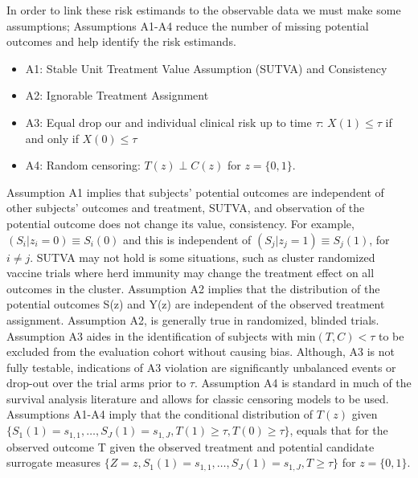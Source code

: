 \documentclass[times, doublespace]{simauth}
\begin{document}
In order to link these risk estimands to the observable data we must make some assumptions; Assumptions A1-A4 reduce the number of missing potential outcomes and help identify the risk estimands.
\begin{itemize}
\item A1: Stable Unit Treatment Value Assumption (SUTVA) and Consistency 
\item A2: Ignorable Treatment Assignment
\item A3: Equal drop our and individual clinical risk up to time $\tau$: $X(1)\leq\tau$ if and only if $X(0)\leq\tau$
\item A4: Random censoring: $T(z) \perp C(z)$ for $z=\{0,1\}$.
\end{itemize} 
Assumption A1 implies that subjects' potential outcomes are independent of other subjects' outcomes and treatment, SUTVA, and observation of the potential outcome does not change its value, consistency. For example, $(S_i|z_i=0) \equiv S_i(0)$ and this is independent of $(S_j|z_j=1) \equiv S_j(1)$, for $i \neq j$. SUTVA may not hold is some situations, such as cluster randomized vaccine trials where herd immunity may change the treatment effect on all outcomes in the cluster.  Assumption A2 implies that the distribution of the potential outcomes S(z) and Y(z) are independent of the observed treatment assignment. Assumption A2, is generally true in randomized, blinded trials.  Assumption A3 aides in the identification of subjects with min$(T,C) < \tau$ to be excluded from the evaluation cohort without causing bias. Although, A3 is not fully testable, indications of A3 violation are significantly unbalanced events or drop-out over the trial arms prior to $\tau$. Assumption A4 is standard in much of the survival analysis literature and allows for classic censoring models to be used. Assumptions A1-A4 imply that the conditional distribution of $T(z)$ given $\{S_{1}(1)=s_{1,1},\ldots,S_{J}(1)=s_{1,J}, T(1)\geq\tau, T(0)\geq\tau\}$, equals that for the observed outcome T given the observed treatment and potential candidate surrogate measures $\{Z=z, S_{1}(1)=s_{1,1},\ldots,S_{J}(1)=s_{1,J},T\geq\tau\}$ for $z=\{0,1\}$.
\end{document}
